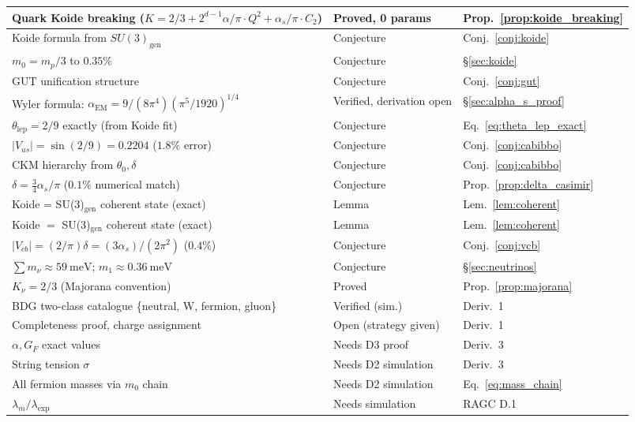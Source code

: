 \documentclass[11pt,a4paper]{article}
\begin{document}
\begin{center}
\begin{tabular}{p{5.5cm}ll}
Quark Koide breaking ($K = 2/3 + 2^{d-1}\alpha/\pi \cdot Q^2 + \alpha_s/\pi \cdot C_2$) & Proved, 0 params & Prop.~\ref{prop:koide_breaking} \\
\midrule
Koide formula from $SU(3)_{\mathrm{gen}}$ & Conjecture & Conj.~\ref{conj:koide} \\
$m_0 = m_p/3$ to $0.35\%$ & Conjecture & \S\ref{sec:koide} \\
GUT unification structure & Conjecture & Conj.~\ref{conj:gut} \\
Wyler formula: $\alpha_{\mathrm{EM}} = 9/(8\pi^4)(\pi^5/1920)^{1/4}$ & Verified, derivation open & \S\ref{sec:alpha_s_proof} \\
$\theta_{\mathrm{lep}} = 2/9$ exactly (from Koide fit) & Conjecture & Eq.~\eqref{eq:theta_lep_exact} \\
$|V_{us}| = \sin(2/9) = 0.2204$ ($1.8\%$ error) & Conjecture & Conj.~\ref{conj:cabibbo} \\
CKM hierarchy from $\theta_0, \delta$ & Conjecture & Conj.~\ref{conj:cabibbo} \\
$\delta = \tfrac{3}{4}\alpha_s/\pi$ ($0.1\%$ numerical match) & Conjecture & Prop.~\ref{prop:delta_casimir} \\
Koide = SU(3)$_\text{gen}$ coherent state (exact) & Lemma & Lem.~\ref{lem:coherent} \\
Koide $=$ SU(3)$_{\mathrm{gen}}$ coherent state (exact) & Lemma & Lem.~\ref{lem:coherent} \\
$|V_{cb}| = (2/\pi)\delta = (3\alpha_s)/(2\pi^2)$ ($0.4\%$) & Conjecture & Conj.~\ref{conj:vcb} \\
$\sum m_\nu \approx 59~\mathrm{meV}$; $m_1 \approx 0.36~\mathrm{meV}$ & Conjecture & \S\ref{sec:neutrinos} \\
$K_\nu = 2/3$ (Majorana convention) & Proved & Prop.~\ref{prop:majorana} \\
\midrule
BDG two-class catalogue \{neutral, W, fermion, gluon\} & Verified (sim.) & Deriv.~1 \\
Completeness proof, charge assignment & Open (strategy given) & Deriv.~1 \\
$\alpha, G_F$ exact values & Needs D3 proof & Deriv.~3 \\
String tension $\sigma$ & Needs D2 simulation & Deriv.~3 \\
All fermion masses via $m_0$ chain & Needs D2 simulation & Eq.~\eqref{eq:mass_chain} \\
$\lambda_m/\lambda_{\mathrm{exp}}$ & Needs simulation & RAGC D.1 \\
\bottomrule
\end{tabular}
\end{center}
\end{document}
